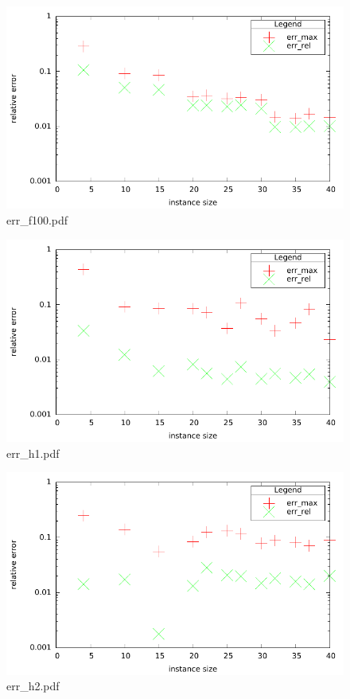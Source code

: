 \documentclass[12pt,a4paper]{article}
\begin{document}
\begin{figure}[H]
\caption{err\_f100.pdf }
\includegraphics{./err_f100.pdf}
\end{figure}

\begin{figure}[H]
\caption{err\_h1.pdf }
\includegraphics{./err_h1.pdf}
\end{figure}

\begin{figure}[H]
\caption{err\_h2.pdf }
\includegraphics{./err_h2.pdf}
\end{figure}
\end{document}
